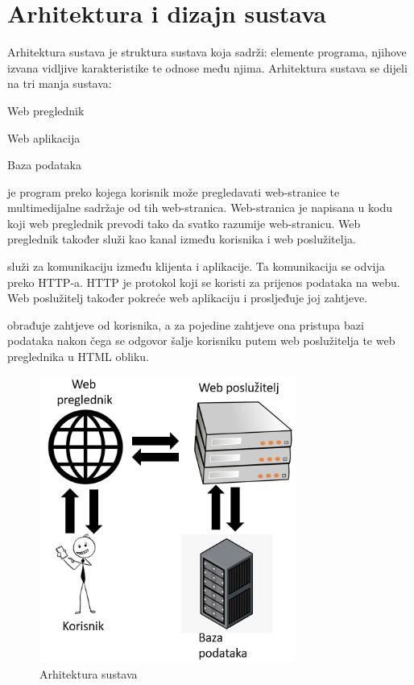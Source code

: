 
\chapter{Arhitektura i dizajn sustava}



Arhitektura sustava je struktura sustava koja sadrži: elemente programa, njihove izvana vidljive karakteristike te odnose među njima.
Arhitektura sustava se dijeli na tri manja sustava:
\begin{packed_item}
	\item[$\bullet$] Web preglednik
	\item[$\bullet$] Web aplikacija
	\item[$\bullet$] Baza podataka
\end{packed_item}



 je program preko kojega korisnik može pregledavati web-stranice te multimedijalne sadržaje od tih web-stranica. Web-stranica je napisana u kodu koji web preglednik prevodi tako da svatko razumije web-stranicu. Web preglednik također služi kao kanal između korisnika i web poslužitelja.


 služi za komunikaciju između klijenta i aplikacije. Ta komunikacija se odvija preko HTTP-a. HTTP je protokol koji se koristi za prijenos podataka na webu. Web poslužitelj također pokreće web aplikaciju i prosljeđuje joj zahtjeve.


 obrađuje zahtjeve od korisnika, a za pojedine zahtjeve ona pristupa bazi podataka nakon čega se odgovor šalje korisniku putem web poslužitelja te web preglednika u HTML obliku.


\begin{figure}[H]
	\centering
	\includegraphics[width=0.75\textwidth]{slike/arhitektura_sustava.PNG} 
	\caption{Arhitektura sustava}
	\label{fig:promjene1} 
\end{figure}


